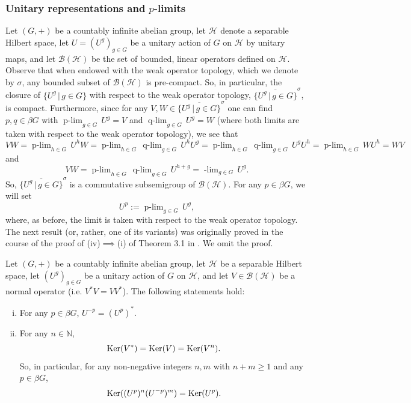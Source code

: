 \documentclass[graybox]{svmult}
\theoremstyle{definition}
\newcommand{\N}{\mathbb{N}}
\newcommand{\plimgG}[3]{\mathop {#1\text{-lim}}_{#2\in #3}\,}
\begin{document}
\subsubsection{Unitary representations and \texorpdfstring{$p$}{p}-limits}\label{sssec:UltrafiltersAndUnitaryReps}
Let $(G,+)$ be a countably infinite abelian group, let $\mathcal H$ denote a separable Hilbert space, let $U=(U^g)_{g\in G}$ be a unitary action of $G$ on $\mathcal H$ by unitary maps, and let $\mathcal B(\mathcal H)$ be the set of bounded, linear operators defined on $\mathcal H$. Observe that when endowed with the weak operator topology, which we denote by $\sigma$, any bounded subset of  $\mathcal B(\mathcal H)$ is pre-compact. So, in particular, the closure of $\{U^g\,|\,g\in G\}$ with respect to the weak operator topology, $\overline{\{U^g\,|\,g\in G\}}^\sigma$, is compact. Furthermore, since for any $V,W\in \overline{\{U^g\,|\,g\in G\}}^\sigma$ one can find $p,q\in\beta G$ with $\plimgG{p}{g}{G}U^g=V$ and $\plimgG{q}{g}{G}U^g=W$ (where both limits are taken with respect to the weak operator topology), we see that 
\begin{equation}\label{eq:CommutingPlimits}
VW=\plimgG{p}{h}{G}U^hW=\plimgG{p}{h}{G}\plimgG{q}{g}{G}U^hU^g=\plimgG{p}{h}{G}\plimgG{q}{g}{G}U^gU^h=\plimgG{p}{h}{G}WU^h=WV
\end{equation}
and
\begin{equation}\label{2.eq:SumIsComposition}
    VW=\plimgG{p}{h}{G}\plimgG{q}{g}{G}U^{h+g}=\plimgG{(p+q)}{g}{G}U^g.
\end{equation}
So, $\overline{\{U^g\,|\,g\in G\}}^\sigma$ is a commutative subsemigroup of $\mathcal B(\mathcal H)$. For any $p\in\beta G$, we will set 
$$
U^p:=\plimgG{p}{g}{G}U^g,
$$
where, as before, the limit is taken with respect to the weak operator topology.\\
The next result (or, rather, one of its variants) was originally proved in the course of the proof of (iv)$\implies$(i) of Theorem 3.1 in \cite{AlmostMixingOfAllOrders}. We omit the proof.
\begin{proposition}\label{2.prop:NormalOperator}
    Let $(G,+)$ be a countably infinite abelian group, let $\mathcal H$ be a separable Hilbert space, let $(U^g)_{g\in G}$ be a unitary action of $G$ on $\mathcal H$, and let $V\in \mathcal B(\mathcal H)$ be a normal operator (i.e. $V^*V=VV^*$). The following statements hold:
    \begin{enumerate}[(i)]
        \item For any $p\in\beta G$, $U^{-p}=(U^p)^*$.
        \item For any $n\in\N$, 
        $$\text{{\rm Ker}}(V^*)=\text{{\rm Ker}}(V)=\text{{\rm Ker}}(V^n).$$
        So, in particular, for any non-negative integers $n,m$ with $n+m\geq 1$ and any $p\in\beta G$, 
        $$
\text{{\rm Ker}}((U^p)^n(U^{-p})^m)=\text{{\rm Ker}}(U^p).
        $$
    \end{enumerate}
\end{proposition}
\end{document}
